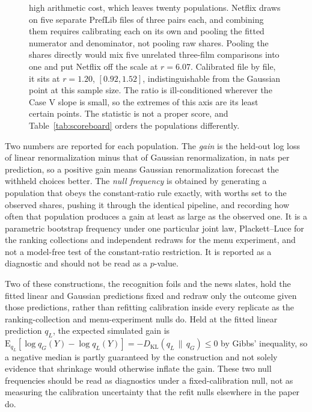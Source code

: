 \documentclass[11pt]{article}
\theoremstyle{italichead}
\begin{document}
\begin{figure}[H]
{high arithmetic cost, which leaves twenty populations. Netflix draws on five separate PrefLib files of three pairs each, and
combining them requires calibrating each on its own and pooling the fitted numerator and
denominator, not pooling raw shares. Pooling the shares directly would mix five unrelated
three-film comparisons into one and put Netflix off the scale at $r = 6.07$. Calibrated file by
file, it sits at $r = 1.20$, $[0.92, 1.52]$, indistinguishable from the Gaussian point at this
sample size. The ratio is ill-conditioned wherever the Case V slope is
small, so the extremes of this axis are its least certain points. The statistic is not a proper
score, and Table~\ref{tab:scoreboard} orders the populations differently.}
\label{fig:line}
\end{figure}

Two numbers are reported for each population. The \emph{gain} is the held-out log loss of linear
renormalization minus that of Gaussian renormalization, in nats per prediction, so a positive gain
means Gaussian renormalization forecast the withheld choices better. The \emph{null frequency} is
obtained by generating a population that obeys the constant-ratio rule exactly, with worths set to
the observed shares, pushing it through the identical pipeline, and recording how often that
population produces a gain at least as large as the observed one. It is a parametric bootstrap
frequency under one particular joint law, Plackett--Luce for the ranking collections and
independent redraws for the menu experiment, and not a model-free test of the constant-ratio
restriction. It is reported as a diagnostic and should not be read as a $p$-value.

Two of these constructions, the recognition foils and the news slates, hold the fitted linear and
Gaussian predictions fixed and redraw only the outcome given those predictions, rather than
refitting calibration inside every replicate as the ranking-collection and menu-experiment nulls
do. Held at the fitted linear prediction $q_L$, the expected simulated gain is
$\mathrm{E}_{q_L}[\log q_G(Y) - \log q_L(Y)] = -D_{\mathrm{KL}}(q_L \,\|\, q_G) \le 0$
by Gibbs' inequality, so a negative median is partly guaranteed by the construction and not solely
evidence that shrinkage would otherwise inflate the gain. These two null frequencies should be
read as diagnostics under a fixed-calibration null, not as measuring the calibration uncertainty
that the refit nulls elsewhere in the paper do.
\end{document}
